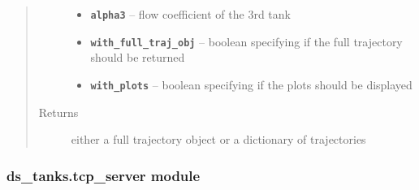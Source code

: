 \documentclass[letterpaper,10pt,english]{sphinxmanual}
\begin{document}
\begin{fulllineitems}
\begin{quote}
\begin{description}
\begin{itemize}
\item {} 
\textbf{\texttt{alpha3}} -- flow coefficient of the 3rd tank

\item {} 
\textbf{\texttt{with\_full\_traj\_obj}} -- boolean specifying if the full trajectory should
be returned

\item {} 
\textbf{\texttt{with\_plots}} -- boolean specifying if the plots should be displayed

\end{itemize}

\item[{Returns}] \leavevmode
either a full trajectory object or a dictionary of trajectories

\end{description}\end{quote}

\end{fulllineitems}



\subsubsection{ds\_tanks.tcp\_server module}
\label{ds_tanks.tcp_server:module-ds_tanks.tcp_server}\label{ds_tanks.tcp_server:ds-tanks-tcp-server-module}\label{ds_tanks.tcp_server::doc}
\end{document}
